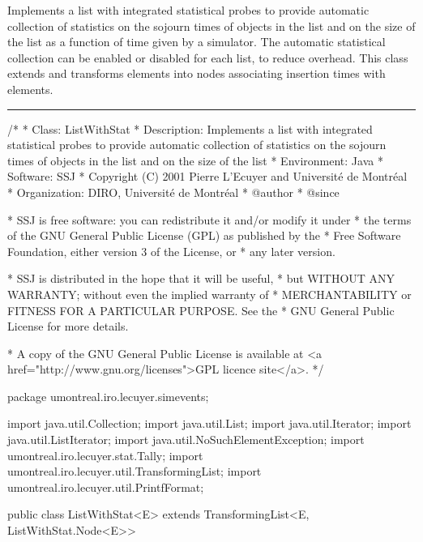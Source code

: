 
Implements a list with integrated statistical
probes to provide automatic collection of
statistics on the sojourn times of objects in the list and on the
size of the list as a function of time given by a simulator.
The automatic statistical collection can be
enabled or disabled for each list, to reduce overhead.
This class extends 
and transforms elements into nodes associating insertion times with elements.

\bigskip\hrule


\begin{code}
\begin{hide}
/*
 * Class:        ListWithStat
 * Description:  Implements a list with integrated statistical probes to
                 provide automatic collection of statistics on the sojourn
                 times of objects in the list and on the size of the list
 * Environment:  Java
 * Software:     SSJ 
 * Copyright (C) 2001  Pierre L'Ecuyer and Université de Montréal
 * Organization: DIRO, Université de Montréal
 * @author       
 * @since

 * SSJ is free software: you can redistribute it and/or modify it under
 * the terms of the GNU General Public License (GPL) as published by the
 * Free Software Foundation, either version 3 of the License, or
 * any later version.

 * SSJ is distributed in the hope that it will be useful,
 * but WITHOUT ANY WARRANTY; without even the implied warranty of
 * MERCHANTABILITY or FITNESS FOR A PARTICULAR PURPOSE.  See the
 * GNU General Public License for more details.

 * A copy of the GNU General Public License is available at
   <a href="http://www.gnu.org/licenses">GPL licence site</a>.
 */
\end{hide}
package umontreal.iro.lecuyer.simevents;\begin{hide}
import java.util.Collection;
import java.util.List;
import java.util.Iterator;
import java.util.ListIterator;
import java.util.NoSuchElementException;
import umontreal.iro.lecuyer.stat.Tally;
import umontreal.iro.lecuyer.util.TransformingList;
import umontreal.iro.lecuyer.util.PrintfFormat;
\end{hide}

public class ListWithStat<E>
             extends TransformingList<E, ListWithStat.Node<E>>\begin{hide} {
   private boolean stats; // true si on a appele setStatCollecting
   private double initTime; // temps de la derniere initialisation
   private Accumulate blockSize; //block stat. sur la longueur de la liste
   private Tally blockSojourn; // block stat. sur les durees de sejour
   private String name;
   private Simulator sim;
\end{hide}
\end{code}

